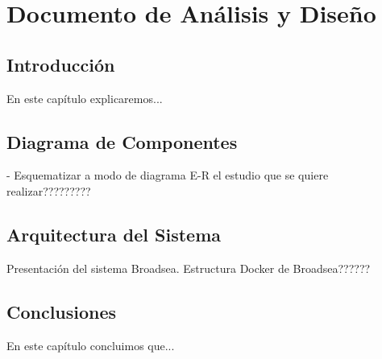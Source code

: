 \chapter{Documento de Análisis y Diseño}\label{cap:07diseño}

\section{Introducción}
En este capítulo explicaremos...


\section{Diagrama de Componentes}

- Esquematizar a modo de diagrama E-R el estudio que se quiere realizar?????????


\section{Arquitectura del Sistema}

Presentación del sistema Broadsea. Estructura Docker de Broadsea??????



\section{Conclusiones}
En este capítulo concluimos que...
